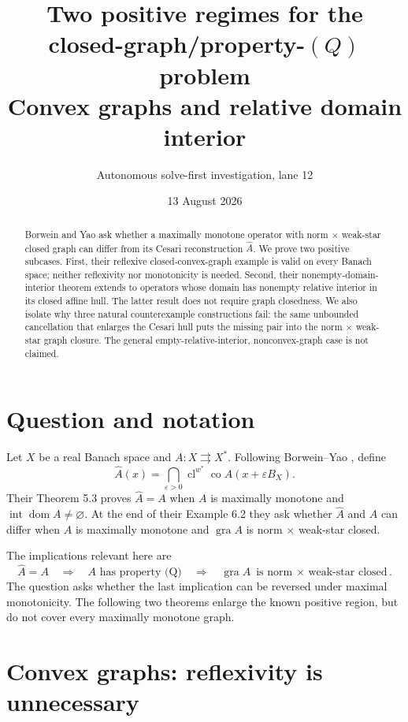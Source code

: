 \documentclass[11pt]{article}
\title{Two positive regimes for the closed-graph/property-\((Q)\) problem\\
\large Convex graphs and relative domain interior}
\author{Autonomous solve-first investigation, lane 12}
\date{13 August 2026}
\newcommand{\gra}{\operatorname{gra}}
\newcommand{\domn}{\operatorname{dom}}
\newcommand{\cl}{\operatorname{cl}}
\newcommand{\co}{\operatorname{co}}
\newcommand{\inte}{\operatorname{int}}
\begin{document}
\maketitle

\begin{abstract}
Borwein and Yao ask whether a maximally monotone operator with norm
$\times$ weak-star closed graph can differ from its Cesari reconstruction
$\widehat A$.  We prove two positive subcases.  First, their reflexive
closed-convex-graph example is valid on every Banach space; neither
reflexivity nor monotonicity is needed.  Second, their nonempty-domain-
interior theorem extends to operators whose domain has nonempty relative
interior in its closed affine hull.  The latter result does not require graph
closedness.  We also isolate why three natural counterexample constructions
fail: the same unbounded cancellation that enlarges the Cesari hull puts the
missing pair into the norm $\times$ weak-star graph closure.  The general
empty-relative-interior, nonconvex-graph case is not claimed.
\end{abstract}

\section{Question and notation}

Let $X$ be a real Banach space and $A:X\rightrightarrows X^*$.  Following
Borwein--Yao \cite{BY}, define
\begin{equation}\label{eq:hat}
 \widehat A(x)=\bigcap_{\varepsilon>0}
 \cl^{w^*}\co A(x+\varepsilon B_X).
\end{equation}
Their Theorem 5.3 proves $\widehat A=A$ when $A$ is maximally monotone and
$\inte\domn A\ne\varnothing$.  At the end of their Example 6.2 they ask
whether $\widehat A$ and $A$ can differ when $A$ is maximally monotone and
$\gra A$ is norm $\times$ weak-star closed.

The implications relevant here are
\[
 \widehat A=A\quad\Longrightarrow\quad A\text{ has property (Q)}
 \quad\Longrightarrow\quad \gra A\text{ is norm $\times$ weak-star closed}.
\]
The question asks whether the last implication can be reversed under maximal
monotonicity.  The following two theorems enlarge the known positive region,
but do not cover every maximally monotone graph.

\section{Convex graphs: reflexivity is unnecessary}
\end{document}

